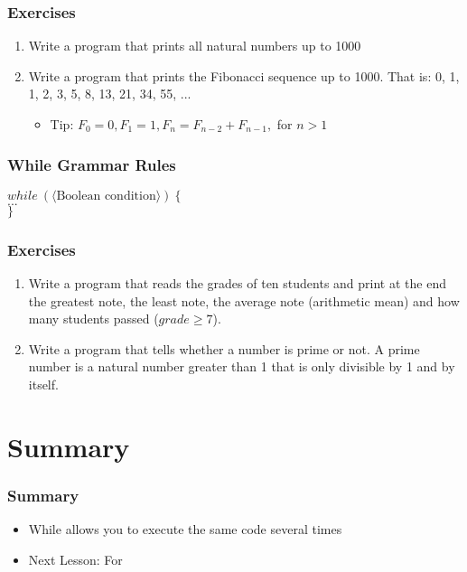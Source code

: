 \documentclass{beamer}
\newcommand{\cindent}{\hskip20pt}
\begin{document}
	\begin{frame}
		\frametitle{Exercises}
		\begin{enumerate}
			\item Write a program that prints all natural numbers up to 1000
			\pause
			\item Write a program that prints the Fibonacci sequence up to 1000. That is: 0, 1, 1, 2, 3, 5, 8, 13, 21, 34, 55, ... 
			\pause
			\begin{itemize}
				\item Tip: $F_0 = 0, F_1 = 1, F_n = F_{n-2} + F_{n-1},$ for $n > 1$
			\end{itemize}
		\end{enumerate}
	\end{frame}

	\begin{frame}
		\frametitle{While Grammar Rules}
		$while\ (\langle \text{Boolean condition} \rangle)\ \{$\\
			\cindent $...$\\
		$\}$\\
	\end{frame}

	\begin{frame}
		\frametitle{Exercises}
		\begin{enumerate}
			\item Write a program that reads the grades of ten students and print at the end the greatest note, the least note, the average note (arithmetic mean) and how many students passed ($grade \ge 7$).
			\pause
			\item Write a program that tells whether a number is prime or not. A prime number is a natural number greater than 1 that is only divisible by 1 and by itself.
		\end{enumerate}
	\end{frame}
		
	\section{Summary}
	
	\begin{frame}
		\frametitle{Summary}
		\begin{itemize}
			\item While allows you to execute the same code several times
			\item Next Lesson: For
		\end{itemize}
	\end{frame}
\end{document}
